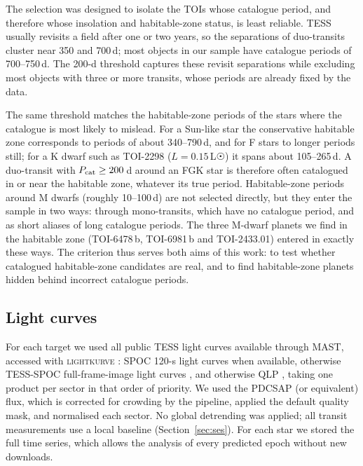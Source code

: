 \documentclass[fleqn,usenatbib]{mnras}
\newcommand{\Pcat}{\ensuremath{P_{\rm cat}}}
\begin{document}
The selection was designed to isolate the TOIs whose catalogue period, and therefore whose insolation and habitable-zone status, is least reliable. TESS usually revisits a field after one or two years, so the separations of duo-transits cluster near 350 and 700\,d; most objects in our sample have catalogue periods of 700--750\,d. The 200-d threshold captures these revisit separations while excluding most objects with three or more transits, whose periods are already fixed by the data.

The same threshold matches the habitable-zone periods of the stars where the catalogue is most likely to mislead. For a Sun-like star the conservative habitable zone \citep{Kopparapu2014} corresponds to periods of about 340--790\,d, and for F stars to longer periods still; for a K dwarf such as TOI-2298 ($L = 0.15$\,L☉) it spans about 105--265\,d. A duo-transit with $\Pcat \geq 200$\,d around an FGK star is therefore often catalogued in or near the habitable zone, whatever its true period. Habitable-zone periods around M dwarfs (roughly 10--100\,d) are not selected directly, but they enter the sample in two ways: through mono-transits, which have no catalogue period, and as short aliases of long catalogue periods. The three M-dwarf planets we find in the habitable zone (TOI-6478\,b, TOI-6981\,b and TOI-2433.01) entered in exactly these ways. The criterion thus serves both aims of this work: to test whether catalogued habitable-zone candidates are real, and to find habitable-zone planets hidden behind incorrect catalogue periods.

\subsection{Light curves}

For each target we used all public TESS light curves available through MAST, accessed with \textsc{lightkurve} \citep{Lightkurve2018}: SPOC 120-s light curves \citep{Jenkins2016} when available, otherwise TESS-SPOC full-frame-image light curves \citep{Caldwell2020}, and otherwise QLP \citep{Huang2020,Kunimoto2021}, taking one product per sector in that order of priority. We used the PDCSAP (or equivalent) flux, which is corrected for crowding by the pipeline, applied the default quality mask, and normalised each sector. No global detrending was applied; all transit measurements use a local baseline (Section~\ref{sec:ses}). For each star we stored the full time series, which allows the analysis of every predicted epoch without new downloads.
\end{document}
